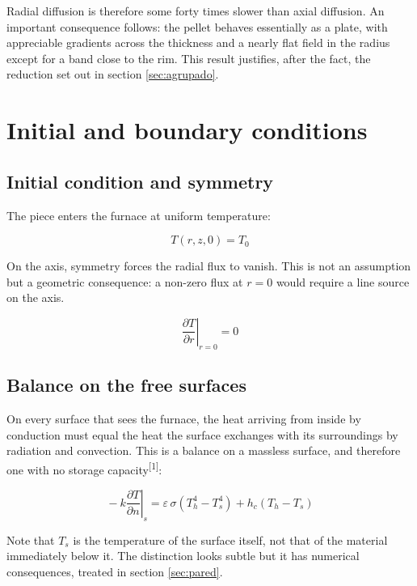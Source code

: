 \documentclass[11pt,a4paper]{article}
\newcommand{\cita}[1]{\textsuperscript{[\textcolor{uji}{#1}]}}
\begin{document}
Radial diffusion is therefore some forty times slower than axial diffusion.
An important consequence follows: the pellet behaves essentially as a plate,
with appreciable gradients across the thickness and a nearly flat field in
the radius except for a band close to the rim. This result justifies, after
the fact, the reduction set out in section \ref{sec:agrupado}.

\section{Initial and boundary conditions}

\subsection{Initial condition and symmetry}

The piece enters the furnace at uniform temperature:

\begin{equation}
T(r,z,0) = T_{0}
\end{equation}

On the axis, symmetry forces the radial flux to vanish. This is not an
assumption but a geometric consequence: a non-zero flux at $r=0$ would
require a line source on the axis.

\begin{equation}
\left. \frac{\partial T}{\partial r} \right|_{r=0} = 0
\end{equation}

\subsection{Balance on the free surfaces}

On every surface that sees the furnace, the heat arriving from inside by
conduction must equal the heat the surface exchanges with its surroundings
by radiation and convection. This is a balance on a massless surface, and
therefore one with no storage capacity\cita{1}:

\begin{equation}
\boxed{\;
-k \left. \frac{\partial T}{\partial n} \right|_{s}
= \varepsilon\, \sigma \left( T_{h}^{4} - T_{s}^{4} \right)
+ h_{c} \left( T_{h} - T_{s} \right)
\;}
\end{equation}

Note that $T_{s}$ is the temperature of the surface itself, not that of the
material immediately below it. The distinction looks subtle but it has
numerical consequences, treated in section \ref{sec:pared}.
\end{document}
